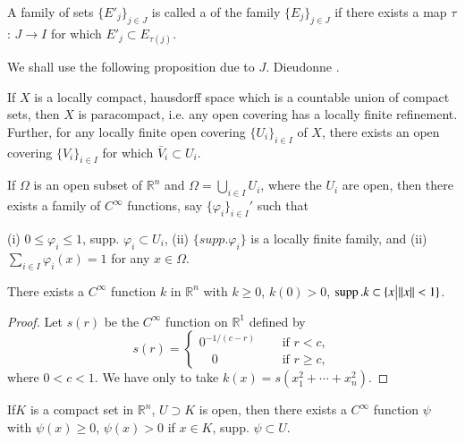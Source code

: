 A family of sets $\{ E'_j \}_{ j \in J}$ is called a 
of the family $\{ E_j \}_{ j \in J}$ if there exists a map $\tau$: $J
\to I$ for which $E'_j \subset E_{\tau (j)}$. 

We shall use the following proposition due to $J$. Dieudonne \cite{9}.

\begin{prop*}
  If $X$ is a locally compact, hausdorff space which is a countable
  union of compact sets, then $X$ is paracompact, i.e. any open
  covering has a locally finite refinement. Further, for any locally
  finite open covering $\{ U_i \}_{ i \in I}$ of $X$, there exists an
  open covering $\{ V_i \}_{ i \in I}$ for which $\bar{V}_i \subset
  U_i$. 
\end{prop*} 
 
\setcounter{theorem}{0}
\begin{theorem}\label{chap1:sec2:thm1}%
  If $\Omega$ is an open subset of $\mathbb{R}^n$ and $\Omega =
  \bigcup \limits_{i \in I} U_i$, where the $U_i$ are open, then there
  exists a family of $C^{\infty}$ functions, say $\{ \varphi_i \}_{i
    \in I}'$ such that 

  (i) $0 \leq \varphi_i \leq 1$, supp. $\varphi_i \subset U_i$, (ii)
  $\{ supp. \varphi_i \}$ is a locally finite family, and (ii) $\sum
  \limits_{i \in I} \varphi_i (x) = 1$ for any $x \in \Omega$. 
\end{theorem}

\setcounter{lemma}{0}
\begin{lemma}\label{chap1:sec2:lem1} %
  There exists a $C^{\infty}$ function $k$ in $\mathbb{R}^n$ with $k
  \geq 0$, $k (0) > 0$, $\operatorname{supp}. k \subset \{ x \big| || x || < 1\}$. 
\end{lemma}

\begin{proof}
  Let $s(r)$ be the $C^{\infty}$ function on $\mathbb{R}^1$ defined by 
  $$ 
  s(r) = 
  \begin{cases} 
    0^{-1 / (c-r)} & \quad \text{ if } r < c,\\ 
    \quad 0 & \quad \text{ if } r \geq c, 
  \end{cases}
  $$ 
  where $0 < c < 1$. We have only to take $k (x) = s(x^2_1 + \cdots +
  x^2_n)$. 
\end{proof}

\begin{lemma}\label{chap1:sec2:lem2}%
  If\pageoriginale $K$ is a compact set in $\mathbb{R}^n$, $U \supset
  K$ is open,  
  then there exists a $C^{\infty}$ function $\psi$ with $\psi (x) \geq
  0$, $\psi (x) > 0$ if $x \in K$, supp. $\psi \subset U$. 
\end{lemma}

